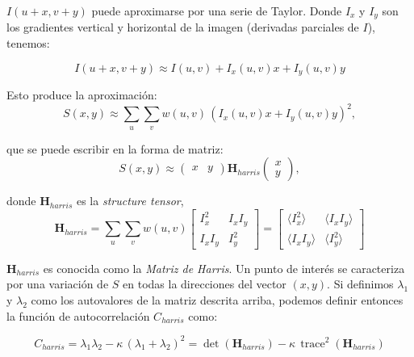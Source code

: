 $I(u + x, v + y)$ puede aproximarse por una serie de Taylor. Donde $I_x$ y $I_y$ son los gradientes vertical y horizontal de la imagen (derivadas parciales de $I$), tenemos:

\begin{equation}
  I(u+x,v+y) \approx I(u,v) + I_x(u,v)x+I_y(u,v)y
\end{equation}

Esto produce la aproximación:
\begin{equation}
  S(x,y) \approx \sum_u \sum_v w(u,v) \, \left( I_x(u,v)x + I_y(u,v)y \right)^2,
\end{equation}

que se puede escribir en la forma de matriz:
\begin{equation}
  S(x,y) \approx \begin{pmatrix} x & y \end{pmatrix} \textbf{H}_{harris} \begin{pmatrix} x \\ y \end{pmatrix},
\end{equation}

donde  $\textbf{H}_{harris}$ es la \emph{structure tensor},
\begin{equation}
  \textbf{H}_{harris} = \sum_u \sum_v w(u,v) 
  \begin{bmatrix}
    I_x^2 & I_x I_y \\
    I_x I_y & I_y^2 
  \end{bmatrix}
  =
  \begin{bmatrix}
    \langle I_x^2 \rangle & \langle I_x I_y \rangle\\
    \langle I_x I_y \rangle & \langle I_y^2 \rangle
  \end{bmatrix}
\end{equation}

$\textbf{H}_{harris}$ es conocida como la \emph{Matriz de Harris}. Un punto de interés se caracteriza por una variación de $S$ en todas la direcciones del vector $(x,y)$. Si definimos $\lambda_1$ y $\lambda_2$  como los autovalores de la matriz descrita arriba, podemos definir entonces la función de autocorrelación $C_{harris}$  como:

\begin{equation}
  C_{harris} = \lambda_1 \lambda_2 - \kappa \, (\lambda_1 + \lambda_2)^2 = \operatorname{det}(\textbf{H}_{harris}) - \kappa \, \operatorname{trace}^2(\textbf{H}_{harris})
\end{equation}

